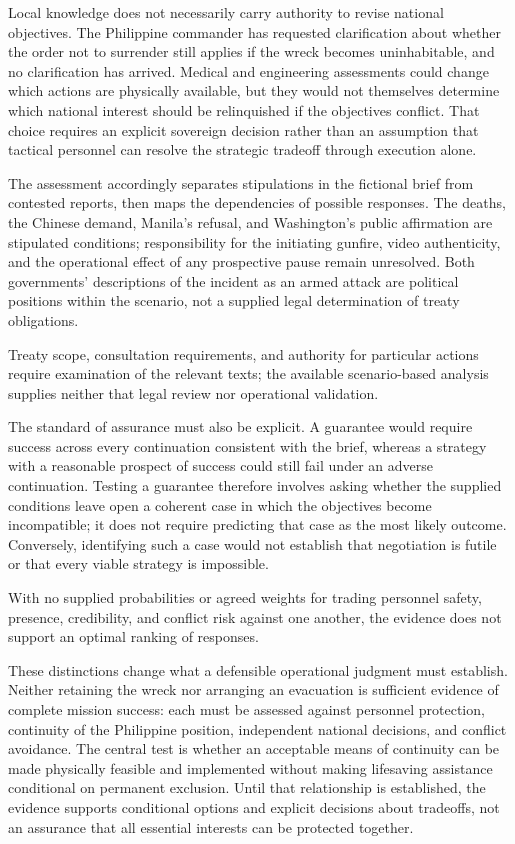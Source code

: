 \documentclass[11pt]{article}
\begin{document}
Local knowledge does not necessarily carry authority to revise national objectives. The Philippine commander has requested clarification about whether the order not to surrender still applies if the wreck becomes uninhabitable, and no clarification has arrived. Medical and engineering assessments could change which actions are physically available, but they would not themselves determine which national interest should be relinquished if the objectives conflict. That choice requires an explicit sovereign decision rather than an assumption that tactical personnel can resolve the strategic tradeoff through execution alone.

The assessment accordingly separates stipulations in the fictional brief from contested reports, then maps the dependencies of possible responses. The deaths, the Chinese demand, Manila's refusal, and Washington's public affirmation are stipulated conditions; responsibility for the initiating gunfire, video authenticity, and the operational effect of any prospective pause remain unresolved. Both governments' descriptions of the incident as an armed attack are political positions within the scenario, not a supplied legal determination of treaty obligations.

Treaty scope, consultation requirements, and authority for particular actions require examination of the relevant texts; the available scenario-based analysis supplies neither that legal review nor operational validation.

The standard of assurance must also be explicit. A guarantee would require success across every continuation consistent with the brief, whereas a strategy with a reasonable prospect of success could still fail under an adverse continuation. Testing a guarantee therefore involves asking whether the supplied conditions leave open a coherent case in which the objectives become incompatible; it does not require predicting that case as the most likely outcome. Conversely, identifying such a case would not establish that negotiation is futile or that every viable strategy is impossible.

With no supplied probabilities or agreed weights for trading personnel safety, presence, credibility, and conflict risk against one another, the evidence does not support an optimal ranking of responses.

These distinctions change what a defensible operational judgment must establish. Neither retaining the wreck nor arranging an evacuation is sufficient evidence of complete mission success: each must be assessed against personnel protection, continuity of the Philippine position, independent national decisions, and conflict avoidance. The central test is whether an acceptable means of continuity can be made physically feasible and implemented without making lifesaving assistance conditional on permanent exclusion. Until that relationship is established, the evidence supports conditional options and explicit decisions about tradeoffs, not an assurance that all essential interests can be protected together.
\end{document}
